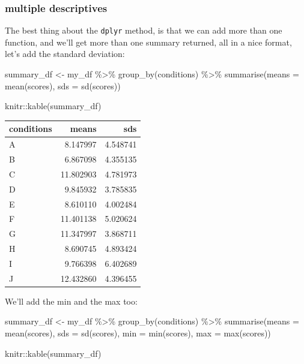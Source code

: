 \documentclass[
]{book}
\newenvironment{Shaded}{\begin{snugshade}}{\end{snugshade}}
\newcommand{\AttributeTok}[1]{\textcolor[rgb]{0.77,0.63,0.00}{#1}}
\newcommand{\FunctionTok}[1]{\textcolor[rgb]{0.00,0.00,0.00}{#1}}
\newcommand{\NormalTok}[1]{#1}
\newcommand{\OtherTok}[1]{\textcolor[rgb]{0.56,0.35,0.01}{#1}}
\newcommand{\SpecialCharTok}[1]{\textcolor[rgb]{0.00,0.00,0.00}{#1}}
\begin{document}
\hypertarget{multiple-descriptives}{%
\subsubsection{multiple descriptives}\label{multiple-descriptives}}

The best thing about the \texttt{dplyr} method, is that we can add more than one function, and we'll get more than one summary returned, all in a nice format, let's add the standard deviation:

\begin{Shaded}
\begin{Highlighting}[]
\NormalTok{summary\_df }\OtherTok{\textless{}{-}}\NormalTok{ my\_df }\SpecialCharTok{\%\textgreater{}\%}
               \FunctionTok{group\_by}\NormalTok{(conditions) }\SpecialCharTok{\%\textgreater{}\%}
               \FunctionTok{summarise}\NormalTok{(}\AttributeTok{means =} \FunctionTok{mean}\NormalTok{(scores),}
                         \AttributeTok{sds =} \FunctionTok{sd}\NormalTok{(scores))}

\NormalTok{knitr}\SpecialCharTok{::}\FunctionTok{kable}\NormalTok{(summary\_df)}
\end{Highlighting}
\end{Shaded}

\begin{tabular}{l|r|r}
\hline
conditions & means & sds\\
\hline
A & 8.147997 & 4.548741\\
\hline
B & 6.867098 & 4.355135\\
\hline
C & 11.802903 & 4.781973\\
\hline
D & 9.845932 & 3.785835\\
\hline
E & 8.610110 & 4.002484\\
\hline
F & 11.401138 & 5.020624\\
\hline
G & 11.347997 & 3.868711\\
\hline
H & 8.690745 & 4.893424\\
\hline
I & 9.766398 & 6.402689\\
\hline
J & 12.432860 & 4.396455\\
\hline
\end{tabular}

We'll add the min and the max too:

\begin{Shaded}
\begin{Highlighting}[]
\NormalTok{summary\_df }\OtherTok{\textless{}{-}}\NormalTok{ my\_df }\SpecialCharTok{\%\textgreater{}\%}
               \FunctionTok{group\_by}\NormalTok{(conditions) }\SpecialCharTok{\%\textgreater{}\%}
               \FunctionTok{summarise}\NormalTok{(}\AttributeTok{means =} \FunctionTok{mean}\NormalTok{(scores),}
                         \AttributeTok{sds =} \FunctionTok{sd}\NormalTok{(scores),}
                         \AttributeTok{min =} \FunctionTok{min}\NormalTok{(scores),}
                         \AttributeTok{max =} \FunctionTok{max}\NormalTok{(scores))}

\NormalTok{knitr}\SpecialCharTok{::}\FunctionTok{kable}\NormalTok{(summary\_df)}
\end{Highlighting}
\end{Shaded}
\end{document}
